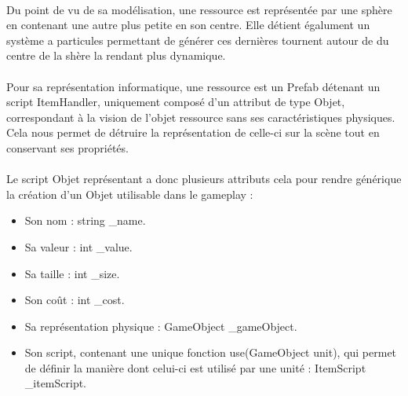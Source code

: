 \documentclass{report}
\begin{document}
\paragraph{}
\paragraph{}Du point de vu de sa modélisation, une ressource est représentée par une sphère en contenant une autre plus petite en son centre. Elle détient égalument un système a particules permettant de générer ces dernières tournent autour de du centre de la shère la rendant plus dynamique. 
\paragraph{} Pour sa représentation informatique, une ressource est un Prefab détenant un script ItemHandler, uniquement composé d'un attribut de type Objet, correspondant à la vision de l'objet ressource sans ses caractéristiques physiques. Cela nous permet de détruire la représentation de celle-ci sur la scène tout en conservant ses propriétés. 
\paragraph{}Le script Objet représentant a donc plusieurs attributs cela pour rendre générique la création d'un Objet utilisable dans le gameplay :
\begin{itemize}
\item Son nom : string \_name.
\item Sa valeur : int \_value.
\item Sa taille : int \_size.
\item Son coût : int \_cost.
\item Sa représentation physique : GameObject \_gameObject.
\item Son script, contenant une unique fonction use(GameObject unit), qui permet de définir la manière dont celui-ci est utilisé par une unité : ItemScript \_itemScript.
\end{itemize}
\end{document}
